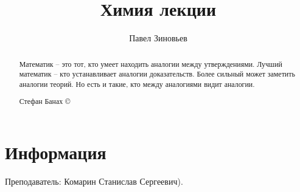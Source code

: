 \documentclass[a4paper, 12pt, oneside]{article}
\title{Химия лекции}
\author{Павел Зиновьев}
\begin{document}
\maketitle
\begin{abstract}
	Математик – это тот, кто умеет находить аналогии между утверждениями. Лучший 
	математик – кто устанавливает аналогии доказательств. Более сильный может заметить 
	аналогии теорий. Но есть и такие, кто между аналогиями видит аналогии.
	\begin{flushright}
		 Стефан Банах \copyright
	\end{flushright}
\end{abstract}
\newpage
\tableofcontents
\contentsname
\newpage


\section{Информация}
Преподаватель: Комарин Станислав Сергеевич).\\
\end{document}
